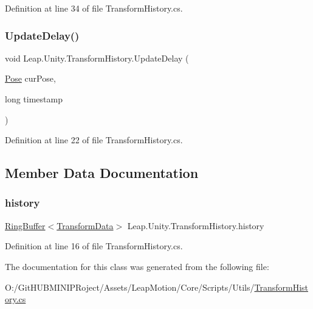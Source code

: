 Definition at line 34 of file Transform\+History.\+cs.

\mbox{\label{class_leap_1_1_unity_1_1_transform_history_a831ac5fe8ef56cd29bb8bce038cac019}} 
\subsubsection{\texorpdfstring{UpdateDelay()}{UpdateDelay()}}
{\footnotesize\ttfamily void Leap.\+Unity.\+Transform\+History.\+Update\+Delay (\begin{DoxyParamCaption}\item[{\mbox{\hyperlink{struct_leap_1_1_unity_1_1_pose}{Pose}}}]{cur\+Pose,  }\item[{long}]{timestamp }\end{DoxyParamCaption})}



Definition at line 22 of file Transform\+History.\+cs.



\subsection{Member Data Documentation}
\mbox{\label{class_leap_1_1_unity_1_1_transform_history_a5d822021ea5550a45bd559d7567ae2ed}} 
\subsubsection{\texorpdfstring{history}{history}}
{\footnotesize\ttfamily \mbox{\hyperlink{class_leap_1_1_unity_1_1_ring_buffer}{Ring\+Buffer}}$<$\mbox{\hyperlink{struct_leap_1_1_unity_1_1_transform_history_1_1_transform_data}{Transform\+Data}}$>$ Leap.\+Unity.\+Transform\+History.\+history}



Definition at line 16 of file Transform\+History.\+cs.



The documentation for this class was generated from the following file\+:\begin{DoxyCompactItemize}
\item 
O\+:/\+Git\+H\+U\+B\+M\+I\+N\+I\+P\+Roject/\+Assets/\+Leap\+Motion/\+Core/\+Scripts/\+Utils/\mbox{\hyperlink{_transform_history_8cs}{Transform\+History.\+cs}}\end{DoxyCompactItemize}
